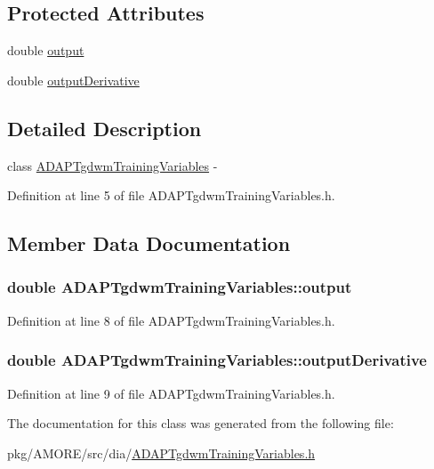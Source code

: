 \subsection*{Protected Attributes}
\begin{DoxyCompactItemize}
\item 
double \hyperlink{class_a_d_a_p_tgdwm_training_variables_a1cb9bedce549960de08e66c4892bca73}{output}
\item 
double \hyperlink{class_a_d_a_p_tgdwm_training_variables_af2ebe81dd9d32e9e1d58fe0e68dbd88e}{outputDerivative}
\end{DoxyCompactItemize}


\subsection{Detailed Description}
class \hyperlink{class_a_d_a_p_tgdwm_training_variables}{ADAPTgdwmTrainingVariables} -\/ 

Definition at line 5 of file ADAPTgdwmTrainingVariables.h.



\subsection{Member Data Documentation}
\hypertarget{class_a_d_a_p_tgdwm_training_variables_a1cb9bedce549960de08e66c4892bca73}{
\subsubsection[{output}]{\setlength{\rightskip}{0pt plus 5cm}double {\bf ADAPTgdwmTrainingVariables::output}}}
\label{class_a_d_a_p_tgdwm_training_variables_a1cb9bedce549960de08e66c4892bca73}


Definition at line 8 of file ADAPTgdwmTrainingVariables.h.

\hypertarget{class_a_d_a_p_tgdwm_training_variables_af2ebe81dd9d32e9e1d58fe0e68dbd88e}{
\subsubsection[{outputDerivative}]{\setlength{\rightskip}{0pt plus 5cm}double {\bf ADAPTgdwmTrainingVariables::outputDerivative}}}
\label{class_a_d_a_p_tgdwm_training_variables_af2ebe81dd9d32e9e1d58fe0e68dbd88e}


Definition at line 9 of file ADAPTgdwmTrainingVariables.h.



The documentation for this class was generated from the following file:\begin{DoxyCompactItemize}
\item 
pkg/AMORE/src/dia/\hyperlink{_a_d_a_p_tgdwm_training_variables_8h}{ADAPTgdwmTrainingVariables.h}\end{DoxyCompactItemize}
